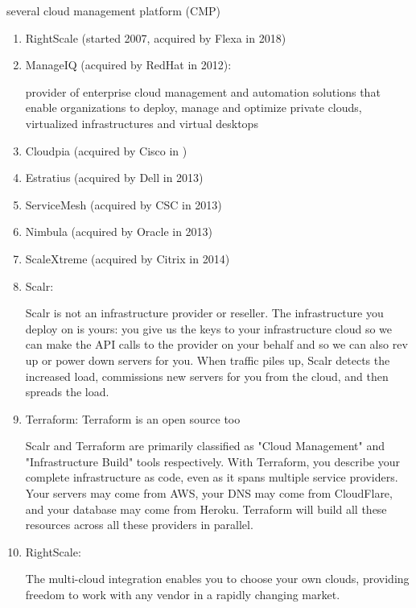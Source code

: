 several cloud management platform (CMP) 
\begin{enumerate}
  \item RightScale (started 2007, acquired by Flexa in 2018)
  
  \item ManageIQ (acquired by RedHat in 2012):
  
  provider of enterprise cloud management and automation solutions that enable
  organizations to deploy, manage and optimize private clouds, virtualized
  infrastructures and virtual desktops
  
  \item Cloudpia (acquired by Cisco in )
  
  \item Estratius (acquired by Dell in 2013)
  
  \item ServiceMesh (acquired by CSC in 2013)
  
  \item Nimbula (acquired by Oracle in 2013)
  
  \item ScaleXtreme (acquired by Citrix in 2014)
  
  \item Scalr:
  
  
Scalr is not an infrastructure provider or reseller. The infrastructure you
deploy on is yours: you give us the keys to your infrastructure cloud so we can
make the API calls to the provider on your behalf and so we can also rev up or
power down servers for you. When traffic piles up, Scalr detects the increased load, commissions new
  servers for you from the cloud, and then spreads the load.
  
  
  \item Terraform: Terraform is an open source too
  
  
Scalr and Terraform are primarily classified as "Cloud Management" and
"Infrastructure Build" tools respectively.
With Terraform, you describe your complete infrastructure as code, even as it
spans multiple service providers. Your servers may come from AWS, your DNS may
come from CloudFlare, and your database may come from Heroku.
Terraform will build all these resources across all these providers in parallel.
  
   \item RightScale:
   
   The multi-cloud integration enables you to choose your own clouds, providing freedom to work with any vendor in a rapidly changing market.
    

\end{enumerate}
